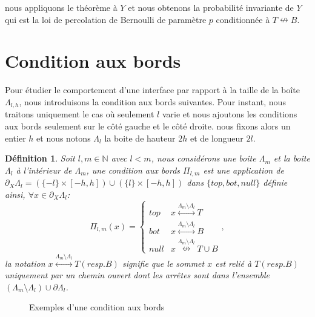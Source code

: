 \documentclass[titlepage,a4paper,12pt]{article}
\newcounter{def}
\newcounter{cor}
\newtheorem{cdb}[def]{Définition}
\newcommand{\connect}{\leftrightarrow}
\newcommand{\nconnect}{\nleftrightarrow}
\begin{document}
nous appliquons le théorème à $Y$ et nous obtenons la probabilité invariante de $Y$ qui est la loi de percolation de Bernoulli de paramètre $p$ conditionnée à $T\nconnect B$.

\section{Condition aux bords}
Pour étudier le comportement d'une interface par rapport à la taille de la boîte $\Lambda_{l,h}$, nous introduisons la condition aux bords suivantes. Pour instant, nous traitons uniquement le cas où seulement $l$ varie et nous ajoutons les conditions aux bords seulement sur le côté gauche et le côté droite. nous fixons alors un entier $h$ et nous notons $\Lambda_l$ la boite de hauteur $2h$ et de longueur $2l$.
\begin{cdb}Soit $l,m\in \mathbb{N}$ avec $l<m$, nous considérons une boîte $\Lambda_m$ et la boîte $\Lambda_l$ à l'intérieur de $\Lambda_m$, une condition aux bords $\Pi_{l,m}$ est une application de $\partial_{X}\Lambda_{l} =(\{-l\}\times[-h,h]) \cup (\{l\}\times [-h,h])$ dans $\{top,bot,null\}$ définie ainsi, $\forall x\in \partial_X\Lambda_{l}$:
$$\Pi_{l,m}(x)=\left\lbrace \begin{array}{cc}
top & x\overset{\Lambda_m \setminus \Lambda_l}{\connect} T\\
bot & x\overset{\Lambda_m \setminus \Lambda_l}{\connect} B\\
null & x\overset{\Lambda_m \setminus \Lambda_l}{\nconnect} T\cup B 
\end{array} \right.,
$$
la notation $x\overset{\Lambda_m \setminus \Lambda_l}{\connect} T(resp. B)$ signifie que le sommet $x$ est relié à $T(resp. B)$ uniquement par un chemin ouvert dont les arrêtes sont dans l'ensemble $(\Lambda_m \setminus \Lambda_l) \cup \partial \Lambda_l$.
\end{cdb}
\begin{figure}[h]
\center
{}
\caption{Exemples d'une condition aux bords}
\end{figure}
\end{document}
